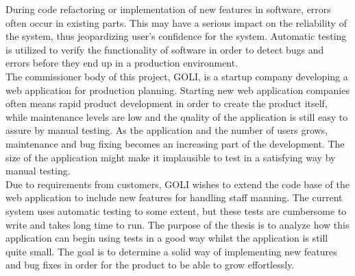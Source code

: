 During code refactoring or implementation of new features in software,
errors often occur in existing parts. This may have a serious impact on
the reliability of the system, thus jeopardizing user's confidence for
the system. Automatic testing is utilized to verify the functionality of
software in order to detect bugs and errors before they end up in a
production environment.\\

The commissioner body of this project, GOLI, is a startup company
developing a web application for production planning. Starting new web
application companies often means rapid product development in order to
create the product itself, while maintenance levels are low and the
quality of the application is still easy to assure by manual testing. As
the application and the number of users grows, maintenance and bug
fixing becomes an increasing part of the development. The size of the
application might make it implausible to test in a satisfying way by
manual testing.\\

Due to requirements from customers, GOLI wishes to extend the code base
of the web application to include new features for handling staff
manning. The current system uses automatic testing to some extent, but
these tests are cumbersome to write and takes long time to run. The
purpose of the thesis is to analyze how this application can begin using
tests in a good way whilst the application is still quite small. The
goal is to determine a solid way of implementing new features and bug
fixes in order for the product to be able to grow effortlessly.\\
